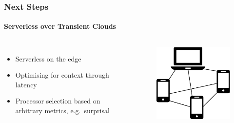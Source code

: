 \documentclass[aspectratio=169]{beamer}
\begin{document}
\begin{frame}
	\frametitle{Next Steps}
	\framesubtitle{Serverless over Transient Clouds}

	\begin{columns}[c]
		\begin{itemize}
			\item Serverless on the edge
			\item Optimising for context through latency
			\item Processor selection based on arbitrary metrics, e.g.\ surprisal
		\end{itemize}
		\begin{figure}
			\centering
			\includegraphics[width=0.8\columnwidth]{tcac}
		\end{figure}
	\end{columns}
\end{frame}
\end{document}
